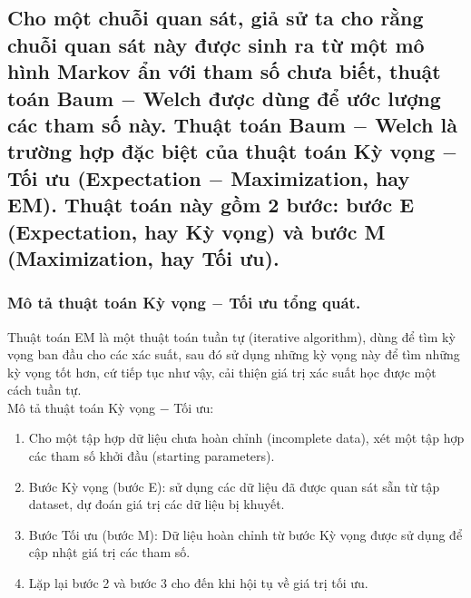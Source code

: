 \subsection{Cho một chuỗi quan sát, giả sử ta cho rằng chuỗi quan sát này được sinh ra từ một mô hình Markov ẩn với tham số chưa biết, thuật toán Baum $-$ Welch được dùng để ước lượng các tham số này. Thuật toán Baum $-$ Welch là trường hợp đặc biệt của thuật toán Kỳ vọng $-$ Tối ưu (Expectation $-$ Maximization, hay EM). Thuật toán này gồm 2 bước: bước E (Expectation, hay Kỳ vọng) và bước M (Maximization, hay Tối ưu).}
\subsubsection{Mô tả thuật toán Kỳ vọng $-$ Tối ưu tổng quát.}
Thuật toán EM là một thuật toán tuần tự (iterative algorithm), dùng để tìm kỳ vọng ban đầu cho các xác suất, sau đó sử dụng những kỳ vọng này để tìm những kỳ vọng tốt hơn, cứ tiếp tục như vậy, cải thiện giá trị xác suất học được một cách tuần tự.\\
Mô tả thuật toán Kỳ vọng $-$ Tối ưu: \supercite{g4gem}
\begin{enumerate}
\item Cho một tập hợp dữ liệu chưa hoàn chỉnh (incomplete data), xét một tập hợp các tham số khởi đầu (starting parameters).
\item Bước Kỳ vọng (bước E): sử dụng các dữ liệu đã được quan sát sẵn từ tập dataset, dự đoán giá trị các dữ liệu bị khuyết.
\item Bước Tối ưu (bước M): Dữ liệu hoàn chỉnh từ bước Kỳ vọng được sử dụng để cập nhật giá trị các tham số.
\item Lặp lại bước 2 và bước 3 cho đến khi hội tụ về giá trị tối ưu.
\end{enumerate}
